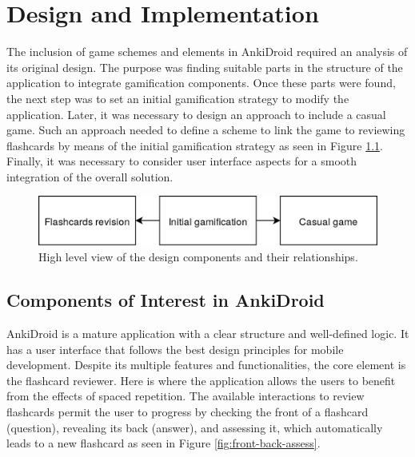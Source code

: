
\chapter{Design and Implementation} %

\label{desi} %

The inclusion of game schemes and elements in AnkiDroid required an analysis of its original design. The purpose was finding suitable parts in the structure of the application to integrate gamification components. Once these parts were found, the next step was to set an initial gamification strategy to modify the application. Later, it was necessary to design an approach to include a casual game. Such an approach needed to define a scheme to link the game to reviewing flashcards by means of the initial gamification strategy as seen in Figure \ref{fig:game-elem-cards}. Finally, it was necessary to consider user interface aspects for a smooth integration of the overall solution.

\begin{figure}[htb]
    \vskip 5mm
        \begin{center}
            \includegraphics[scale=0.3]{./Figures/design.png}
            \caption{High level view of the design components and their relationships.}
            \label{fig:game-elem-cards}
        \end{center}
    \vskip -5mm
\end{figure}


\section{Components of Interest in AnkiDroid}
\label{desi-components-interest}
AnkiDroid is a mature application with a clear structure and well-defined logic. It has a user interface that follows the best design principles for mobile development. Despite its multiple features and functionalities, the core element is the flashcard reviewer. Here is where the application allows the users to benefit from the effects of spaced repetition. The available interactions to review flashcards permit the user to progress by checking the front of a flashcard (question), revealing its back (answer), and assessing it, which automatically leads to a new flashcard as seen in Figure \ref{fig:front-back-assess}.

